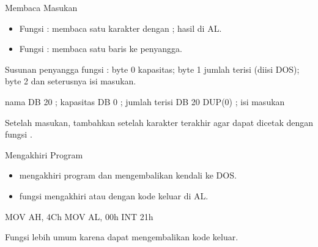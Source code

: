 \documentclass[aspectratio=169,11pt]{beamer}
\begin{document}
\begin{frame}[fragile]{Membaca Masukan}
\small
\begin{itemize}
    \item Fungsi : membaca satu karakter dengan
          ; hasil di AL.
    \item Fungsi : membaca satu baris ke penyangga.
\end{itemize}

\vspace{0.15em}
{\footnotesize Susunan penyangga fungsi : byte 0 kapasitas;
byte 1 jumlah terisi (diisi DOS); byte 2 dan seterusnya isi
masukan.\par}

\vspace{0.2em}
\begin{kodeasm}[numbers=none]
nama DB 20          ; kapasitas
     DB 0           ; jumlah terisi
     DB 20 DUP(0)   ; isi masukan
\end{kodeasm}

\vspace{0.1em}
{\footnotesize\color{obeGray}Setelah masukan, tambahkan
 setelah karakter terakhir agar dapat dicetak dengan
fungsi .\par}
\end{frame}

\begin{frame}[fragile]{Mengakhiri Program}
\small
\begin{itemize}
    \item {} mengakhiri program  dan
          mengembalikan kendali ke DOS.
    \item {} fungsi  mengakhiri 
          atau  dengan kode keluar di AL.
\end{itemize}

\vspace{0.2em}
\begin{kodeasm}[numbers=none]
MOV AH, 4Ch
MOV AL, 00h
INT 21h
\end{kodeasm}

\vspace{0.1em}
{\footnotesize\color{obeGray}Fungsi  lebih umum karena
dapat mengembalikan kode keluar.\par}
\end{frame}
\end{document}
